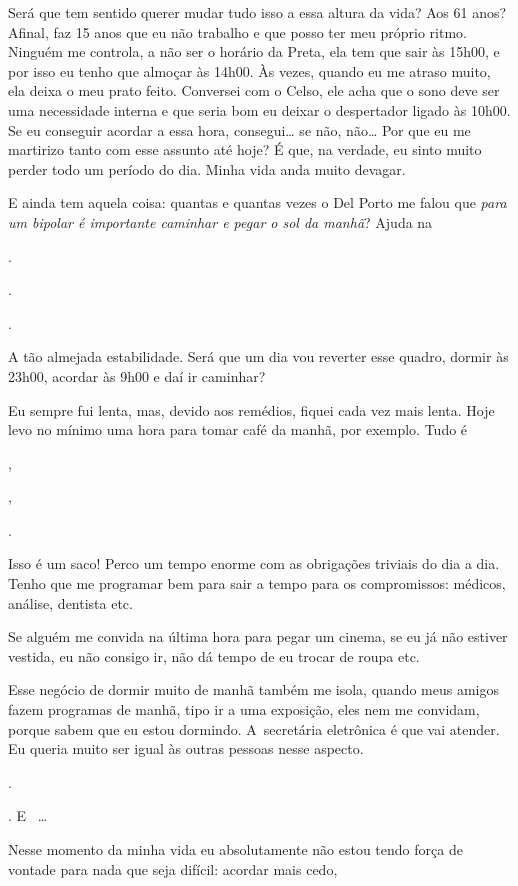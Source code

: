 Será que tem sentido querer mudar tudo isso a essa altura da vida? Aos
61 anos? Afinal, faz 15 anos que eu não trabalho e que posso ter meu
próprio ritmo. Ninguém me controla, a não ser o horário da Preta, ela
tem que sair às 15h00, e por isso eu tenho que almoçar às 14h00. Às
vezes, quando eu me atraso muito, ela deixa o meu prato feito. Conversei
com o Celso, ele acha que o sono deve ser uma necessidade interna e que
seria bom eu deixar o despertador ligado às 10h00. Se eu conseguir
acordar a essa hora, consegui… se não, não… Por que eu me
martirizo tanto com esse assunto até hoje? É que, na verdade, eu sinto
muito perder todo um período do dia. Minha vida anda muito devagar.

E ainda tem aquela coisa: quantas e quantas vezes o Del Porto me falou
que \emph{para um bipolar é importante caminhar e pegar o sol da manhã}?
Ajuda na

.

.

.

A tão almejada estabilidade. Será que um dia vou reverter esse quadro,
dormir às 23h00, acordar às 9h00 e daí ir caminhar?

Eu sempre fui lenta, mas, devido aos remédios, fiquei cada vez mais
lenta. Hoje levo no mínimo uma hora para tomar café da manhã, por
exemplo. Tudo é

,

,

.

Isso é um saco! Perco um tempo enorme com as obrigações triviais do
dia a dia. Tenho que me programar bem para sair a tempo para os
compromissos: médicos, análise, dentista etc.

Se alguém me convida na última hora para pegar um cinema, se eu já não
estiver vestida, eu não consigo ir, não dá tempo de eu trocar de roupa
etc.

Esse negócio de dormir muito de manhã também me isola, quando meus
amigos fazem programas de manhã, tipo ir a uma exposição, eles nem me
convidam, porque sabem que eu estou dormindo. A~secretária eletrônica é
que vai atender. Eu queria muito ser igual às outras pessoas nesse
aspecto.

.

. E~   …

Nesse momento da minha vida eu absolutamente não estou tendo força de
vontade para nada que seja difícil: acordar mais cedo,

